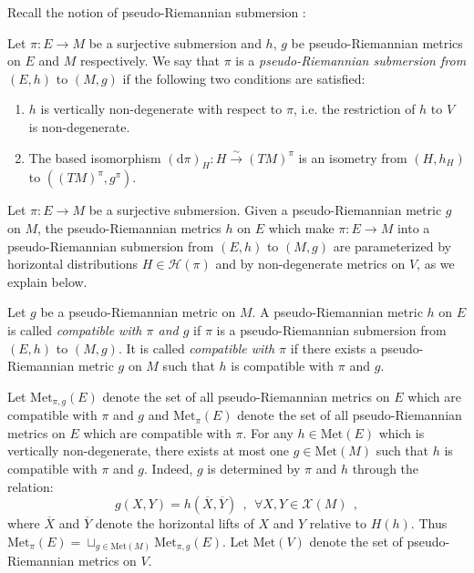 \documentclass[10pt, cmp, numbook, final, a4paper]{svjour}
\def\dd{\mathrm{d}}
\newcommand{\be}{\begin{equation*}}
\newcommand{\ee}{\end{equation*}}
\def\cX{\mathcal{X}}
\def\cH{\mathcal{H}}
\def\cX{\mathcal{X}}
\def\Met{\mathrm{Met}}
\begin{document}
Recall the notion of pseudo-Riemannian submersion \cite[Chapter 7,
Definition 44]{ONeillBook}:

\begin{definition}
Let $\pi:E\rightarrow M$ be a surjective submersion and $h$, $g$ be
pseudo-Riemannian metrics on $E$ and $M$ respectively. We say that
$\pi$ is a {\em pseudo-Riemannian submersion from} $(E,h)$ to $(M,g)$
if the following two conditions are satisfied:
\begin{enumerate}[1.]
\item $h$ is vertically non-degenerate with respect to $\pi$, i.e. the
  restriction of $h$ to $V$ is non-degenerate.
\item The based isomorphism $(\dd\pi)_H:H\stackrel{\sim}{\rightarrow}
  (TM)^\pi$ is an isometry from $(H,h_H)$ to $((TM)^\pi,g^\pi)$.
\end{enumerate}
\end{definition}

\noindent Let $\pi:E\rightarrow M$ be a surjective submersion.  Given
a pseudo-Riemannian metric $g$ on $M$, the pseudo-Riemannian metrics
$h$ on $E$ which make $\pi:E\rightarrow M$ into a pseudo-Riemannian
submersion from $(E,h)$ to $(M,g)$ are parameterized by horizontal
distributions $H\in \cH(\pi)$ and by non-degenerate metrics on $V$, as
we explain below.


\begin{definition}
Let $g$ be a pseudo-Riemannian metric on $M$. A pseudo-Riemannian
metric $h$ on $E$ is called {\em compatible with $\pi$ and $g$} if
$\pi$ is a pseudo-Riemannian submersion from $(E,h)$ to $(M,g)$. It is
called {\em compatible with $\pi$} if there exists a pseudo-Riemannian
metric $g$ on $M$ such that $h$ is compatible with $\pi$ and $g$.
\end{definition}

\noindent 
Let $\Met_{\pi, g}(E)$ denote the set of all pseudo-Riemannian metrics
on $E$ which are compatible with $\pi$ and $g$ and $\Met_\pi(E)$
denote the set of all pseudo-Riemannian metrics on $E$ which are
compatible with $\pi$. For any $h\in \Met(E)$ which is vertically
non-degenerate, there exists at most one $g\in \Met(M)$ such that $h$
is compatible with $\pi$ and $g$. Indeed, $g$ is determined by $\pi$
and $h$ through the relation:
\be
g(X,Y)=h(\overline{X},\overline{Y})~~,~~\forall X,Y\in \cX(M)~~,
\ee
where $\overline{X}$ and $\overline{Y}$ denote the horizontal lifts of
$X$ and $Y$ relative to $H(h)$. Thus
$\Met_\pi(E)=\sqcup_{g\in\Met(M)}\Met_{\pi,g}(E)$. Let $\Met(V)$
denote the set of pseudo-Riemannian metrics on $V$.
\end{document}
